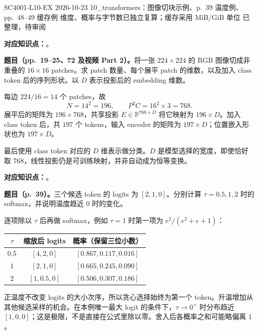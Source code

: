 

\examplemeta
  {SC4001-L10-EX}
  {2026-10-23}
  {10\_transformers：图像切块示例、p.~39 温度例、pp.~48--49 缓存例}
  {维度、概率与字节数已独立复算；缓存采用 MiB/GiB 单位}
  {已整理，待审阅}


\textbf{对应知识点：}。

\textbf{题目（pp.~19--25、72 及视频 Part 2）。}将一张 $224\times224$ 的 RGB 图像切成非重叠的 $16\times16$ patches。求 patch 数量、每个展平 patch 的维数，以及加入 class token 后的序列形状。以 $D$ 表示投影后的 embedding 维数。

\begin{workedsolution}
每边 $224/16=14$ 个 patches，故
\[
 N=14^2=196,\qquad P^2C=16^2\times3=768.
\]
展平后的矩阵为 $196\times768$，共享投影 $E\in\mathbb R^{768\times D}$ 将它映射为 $196\times D$。加入 class token 后，共 $197$ 个 tokens，输入 encoder 的矩阵为 $197\times D$；位置嵌入形状也为 $197\times D$。

最后使用 class token 对应的 $D$ 维表示做分类。$D$ 是模型选择的宽度，即使恰好取 $768$，线性投影仍是可训练映射，并非自动成为恒等变换。
\end{workedsolution}


\textbf{对应知识点：}。

\textbf{题目（p.~39）。}三个候选 token 的 logits 为 $[2,1,0]$。分别计算 $\tau=0.5,1,2$ 时的 softmax，并说明温度趋近 $0$ 时的变化。

\begin{workedsolution}
逐项除以 $\tau$ 后再做 softmax，例如 $\tau=1$ 时第一项为 $e^2/(e^2+e+1)$：
\begin{center}
\begin{tabular}{@{}ccc@{}}
\toprule
$\tau$ & 缩放后 logits & 概率（保留三位小数） \\
\midrule
$0.5$ & $[4,2,0]$ & $[0.867,0.117,0.016]$ \\
$1$ & $[2,1,0]$ & $[0.665,0.245,0.090]$ \\
$2$ & $[1,0.5,0]$ & $[0.506,0.307,0.186]$ \\
\bottomrule
\end{tabular}
\end{center}
正温度不改变 logits 的大小次序，所以贪心选择始终为第一个 token。升温增加从其他候选采样的机会。在本例唯一最大 logit 的条件下，$\tau\to0^+$ 时分布趋近 $[1,0,0]$；这是极限，不是直接在公式里除以零。舍入后各概率之和可能略偏离 $1$。
\end{workedsolution}

